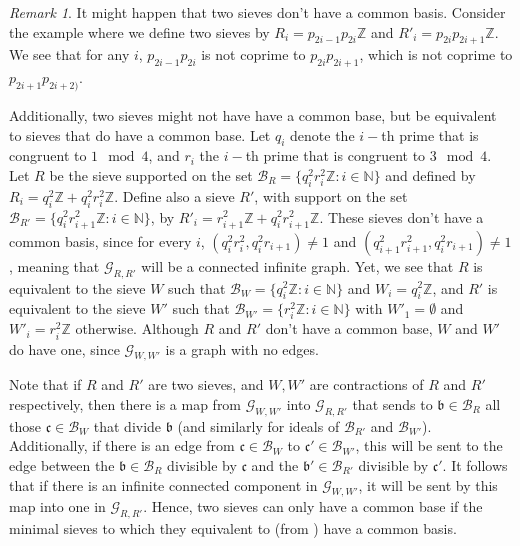 \documentclass[a4paper,11pt,reqno]{amsart}
\theoremstyle{plain}
\theoremstyle{remark}
\newtheorem{remark}[theorem]{Remark}
\newcommand{\z}{\mathbb{Z}}
\newcommand{\cb}{\mathcal{B}}
\newcommand{\gb}{\mathfrak{b}}
\newcommand{\gc}{\mathfrak{c}}
\begin{document}
		\begin{remark}
			\label{rmk: sieves without common base}
			It might happen that two sieves don't have a common basis. Consider the example where we define two sieves by $R_i = p_{2i-1}p_{2i}\z$ and $R'_i = p_{2i}p_{2i+1}\z$. We see that for any $i$, $ p_{2i-1}p_{2i}$ is not coprime to $ p_{2i}p_{2i+1}$, which is not coprime to $ p_{2i+1}p_{2i+2)}$.
			
			Additionally, two sieves might not have have a common base, but be equivalent to sieves that do have a common base. Let $q_i$ denote the $i-$th prime that is congruent to $1 \mod 4$, and  $r_i$ the $i-$th prime that is congruent to $3 \mod 4$. Let $R$ be the sieve supported on the set $\cb_{R} = \{q_i^2r_i^2\z: i \in \mathbb{N}\}$ and defined by $R_i = q_i^2\z + q_i^2r_i^2\z$. Define also a sieve $R'$, with support on the set $\cb_{R'} = \{q_i^2r_{i+1}^2\z: i \in \mathbb{N}\}$,  by $R'_i = r_{i+1}^2\z + q_i^2r_{i+1}^2\z$. These sieves don't have a common basis, since for every $i$, $(q_i^2r_i^2, q_i^2r_{i+1}) \neq 1$ and $(q_{i+1}^2r_{i+1}^2, q_i^2r_{i+1}) \neq 1$, meaning that $\mathcal{G}_{R,R'}$ will be a connected infinite graph. Yet, we see that $R$ is equivalent to the sieve $W$ such that $\cb_W = \{q_i^2\z:i \in \mathbb{N}\}$ and $W_i = q_i^2\z$, and $R'$ is equivalent to the sieve $W'$ such that  $\cb_{W'} = \{r_{i}^2\z:i \in \mathbb{N}\}$ with $W'_1 = \emptyset$ and $W'_i = r_i^2\z$ otherwise. Although $R$ and $R'$ don't have a common base, $W$ and $W'$ do have one, since $\mathcal{G}_{W,W'}$ is a graph with no edges.
			
			Note that if $R$ and $R'$ are two sieves, and $W,W'$ are contractions of $R$ and $R'$ respectively, then there is a map from  $\mathcal{G}_{W,W'}$ into $\mathcal{G}_{R,R'}$ that sends to $\gb \in \cb_R$ all those $\gc \in \cb_{W}$ that divide $\gb$  (and similarly for ideals of $\cb_{R'}$ and $\cb_{W'}$). Additionally, if there is an edge from $\gc \in \cb_W $ to $\gc' \in \cb_{W'}$, this will be sent to the edge between the $\gb \in \cb_R$ divisible by $\gc$ and the  $\gb' \in \cb_{R'}$ divisible by $\gc'$. It follows that if there is an infinite connected component in $\mathcal{G}_{W,W'}$, it will be sent by this map into one in $\mathcal{G}_{R,R'}$. Hence, two sieves can only have a common base if the  minimal sieves to which they equivalent to (from ) have a common basis.
		\end{remark}
		
\end{document}
